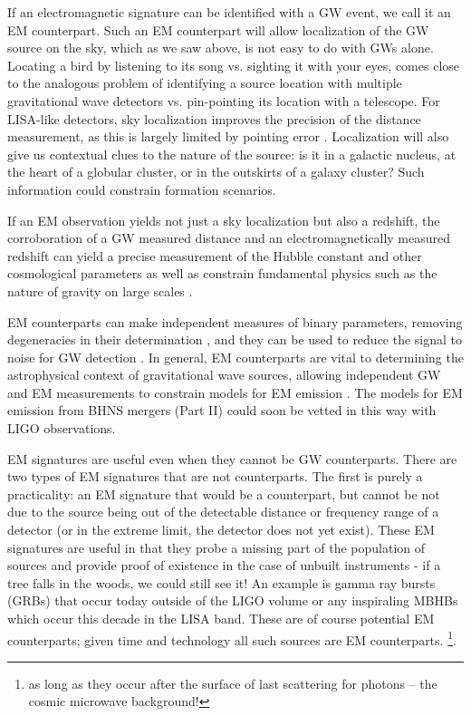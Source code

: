 If an electromagnetic signature can be identified with a GW event, we call it
an EM counterpart. Such an EM counterpart will allow localization of the GW
source on the sky, which as we saw above, is not easy to do with GWs alone.
Locating a bird by listening to its song vs. sighting it with your eyes, comes
close to the analogous problem of identifying a source location with multiple
gravitational wave detectors vs. pin-pointing its location with a telescope.
For LISA-like detectors, sky localization improves the
precision of the distance measurement, as this is largely limited by pointing
error \citep{Cutler:1998, Hughes:2002}. Localization will also give us contextual
clues to the nature of the source: is it in a galactic nucleus, at the heart
of a globular cluster, or in the outskirts of a galaxy cluster? Such
information could constrain formation scenarios.

If an EM observation yields not just a sky localization but also a redshift,
the corroboration of a GW measured distance and an electromagnetically
measured redshift can yield a precise measurement of the Hubble constant and
other cosmological parameters \citep{Schutz:1986, KrolakSchutz:1987,
ChernoffFinn:1993, Schutz:2002, HolzHughes:2005, Dalal:2006, Kocsis+2006,
Kocsis+2008, CutlerHolz:2009,  Nissanke:GRBStndSirens:2010, Nishizawa:StndSirens:2011, Taylor:StndSirens:2012,
Tamanini:2016} as well as constrain fundamental physics such as the nature of
gravity on large scales \citep{Deffayet:2007, Camera:StndSirens:2013}.

EM counterparts can make independent measures of binary parameters, removing
degeneracies in their determination \citep{HughesHolz:2003}, and they can be
used to reduce the signal to noise for GW detection \citep{KochanekPiran:1993,
HarryFairhurst:2011}. In general, EM counterparts are vital to determining the
astrophysical context of gravitational wave sources, allowing independent GW
and EM measurements to constrain models for EM emission \citep{Phinney:2009,
MandelO'Sh:2010}. The models for EM emission from BHNS mergers (Part II) could
soon be vetted in this way with LIGO observations.

EM signatures are useful even when they cannot be GW counterparts. There are
two types of EM signatures that are not counterparts. The first is  purely a
practicality: an EM signature that would be a counterpart, but cannot be not
due to the source being out of the detectable distance or frequency range of a
detector (or in the extreme limit, the detector does not yet exist). These EM
signatures are useful in that they probe a missing part of the population of
sources and provide proof of existence in the case of unbuilt instruments - if
a tree falls in the woods, we could still see it! An example is gamma ray
bursts (GRBs) that occur today outside of the LIGO volume or any inspiraling
MBHBs which occur this decade in the LISA band. These are of course potential
EM counterparts; given time and technology all such sources are EM
counterparts. \footnote{as long as they occur after the surface of last
scattering for photons -- the cosmic microwave background!}. %

